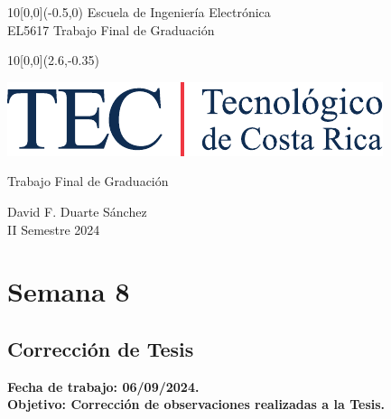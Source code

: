 \documentclass[12pt,letterpaper]{article}
\newcommand{\EstudianteA}{David F. Duarte Sánchez}
\begin{document}
	
\graphicspath{{./}{./fig/}}


%
\begin{textblock}{10}[0,0](-0.5,0)
	\large Escuela de Ingeniería Electrónica \\ 
	EL5617 Trabajo Final de Graduación \\
\end{textblock}

%
\begin{textblock}{10}[0,0](2.6,-0.35)
	\begin{flushright}
		\includegraphics[scale=0.8]{Firma_TEC-4.pdf}
	\end{flushright}
\end{textblock}

\begin{center}
	\vspace{70mm}
	{\large\color{tecRojo} Trabajo Final de Graduación}
	\par\vspace{8mm}
	{\Large\bf\color{tecAzul}{Bitácora de Trabajo - Entrega 4}}
	\par\vspace{100mm}
	{{\EstudianteA \\ II Semestre 2024} 
	\vspace{8mm}}
\end{center}

\newpage

\renewcommand{\baselinestretch}{1.1}    %


\section{Semana 8}
\subsection{Corrección de Tesis}

\bf{Fecha de trabajo:} 06/09/2024.\\
\bf{Objetivo:} Corrección de observaciones realizadas a la Tesis.
\end{document}
